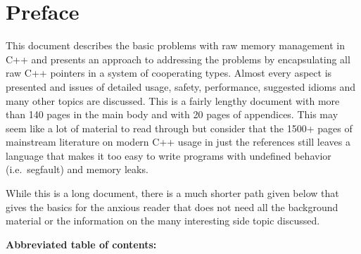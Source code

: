 \documentclass[pdf,ps2pdf,11pt]{SANDreport}
\begin{document}
%
\cleardoublepage   %
\tableofcontents
\listoffigures
\listoftables


\clearpage
\section*{Preface}

This document describes the basic problems with raw memory management
in C++ and presents an approach to addressing the problems by
encapsulating all raw C++ pointers in a system of cooperating types.
Almost every aspect is presented and issues of detailed usage, safety,
performance, suggested idioms and many other topics are discussed.
This is a fairly lengthy document with more than 140 pages in the main
body and with 20 pages of appendices.  This may seem like a lot of
material to read through but consider that the 1500+ pages of
mainstream literature on modern C++ usage in just the references
{}\cite{stroustrup97, C++CodingStandards05, C++Gotchas03,
EffectiveC++ThirdEdition} still leaves a language that makes it too
easy to write programs with undefined behavior (i.e.\ segfault) and
memory leaks.

While this is a long document, there is a much shorter path given
below that gives the basics for the anxious reader that does not need
all the background material or the information on the many interesting
side topic discussed.

{}\noindent\textbf{Abbreviated table of contents:}
\end{document}
